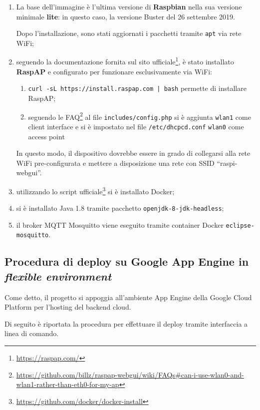 \begin{enumerate}
  \item
    La base dell'immagine è l'ultima versione di \textbf{Raspbian} nella sua versione minimale \textbf{lite}:
    in questo caso, la versione Buster del 26 settembre 2019.

    Dopo l'installazione, sono stati aggiornati i pacchetti tramite \texttt{apt} via rete WiFi;
  \item
    seguendo la documentazione fornita sul sito ufficiale\footnote{\url{https://raspap.com/}},
    è stato installato \textbf{RaspAP} e configurato per funzionare esclusivamente via WiFi:
    \begin{enumerate}
      \item
        \texttt{curl -sL https://install.raspap.com | bash} permette di installare RaspAP\@;
      \item
        seguendo le FAQ\footnote{\url{https://github.com/billz/raspap-webgui/wiki/FAQs\#can-i-use-wlan0-and-wlan1-rather-than-eth0-for-my-ap}}
        al file \texttt{includes/config.php} si è aggiunta \texttt{wlan1} come client interface e si è impostato nel file \texttt{/etc/dhcpcd.conf}
        \texttt{wlan0} come access point
    \end{enumerate}
    In questo modo, il dispositivo dovrebbe essere in grado di collegarsi alla rete WiFi pre-configurata e mettere a disposizione una rete con SSID ``raspi-webgui''.
  \item
    utilizzando lo script ufficiale\footnote{\url{https://github.com/docker/docker-install}} si è installato Docker;
  \item
    si è installato Java 1.8 tramite pacchetto \texttt{openjdk-8-jdk-headless};
  \item
    il broker MQTT Mosquitto viene eseguito tramite container Docker \texttt{eclipse-mosquitto}.
\end{enumerate}

\subsection{Procedura di deploy su Google App Engine in \emph{flexible environment}}\label{app:gcp}

Come detto, %
il progetto si appoggia all'ambiente App Engine della Google Cloud Platform per l'hosting del backend cloud.

Di seguito è riportata la procedura per effettuare il deploy tramite interfaccia a linea di comando.

